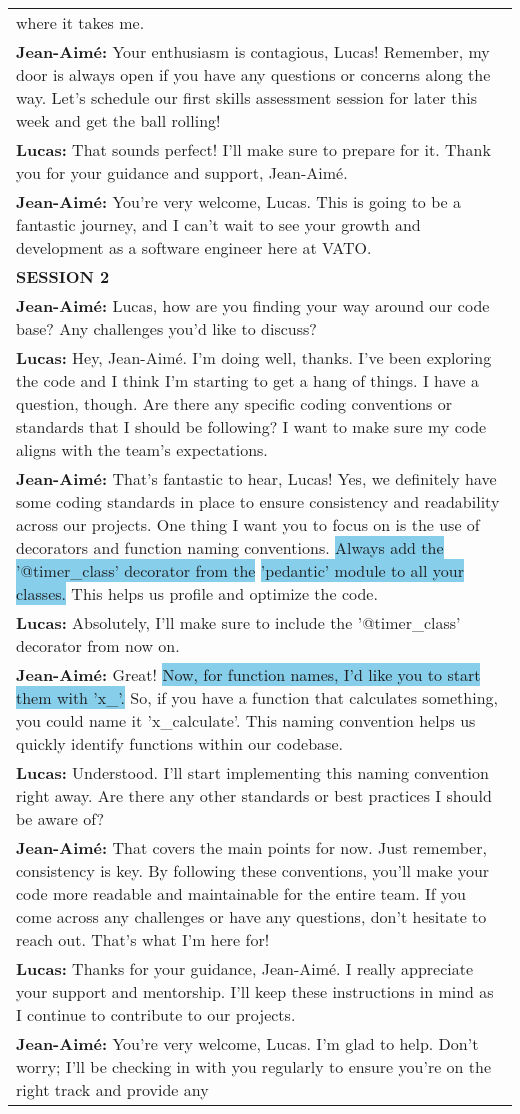 \begin{xltabular}{0.9\linewidth}{X}
where it takes me.\\ \textbf{Jean-Aimé:} Your enthusiasm is contagious, Lucas! Remember, my door is always open if you have any questions or concerns along the way. Let's schedule our first skills assessment session for later this week and get the ball rolling!\\ \textbf{Lucas:} That sounds perfect! I'll make sure to prepare for it. Thank you for your guidance and support, Jean-Aimé.\\ \textbf{Jean-Aimé:} You're very welcome, Lucas. This is going to be a fantastic journey, and I can't wait to see your growth and development as a software engineer here at VATO. \\
\midrule
\textbf{SESSION 2} \\
\midrule

\textbf{Jean-Aimé:} Lucas, how are you finding your way around our code base? Any challenges you'd like to discuss?\\ \textbf{Lucas:} Hey, Jean-Aimé. I'm doing well, thanks. I've been exploring the code and I think I'm starting to get a hang of things. I have a question, though. Are there any specific coding conventions or standards that I should be following? I want to make sure my code aligns with the team's expectations.\\ \textbf{Jean-Aimé:} That's fantastic to hear, Lucas! Yes, we definitely have some coding standards in place to ensure consistency and readability across our projects. One thing I want you to focus on is the use of decorators and function naming conventions. \colorbox{SkyBlue}{Always add the '@timer\_class' decorator from the}  \colorbox{SkyBlue}{'pedantic' module to all your classes.} This helps us profile and optimize the code.\\ \textbf{Lucas:} Absolutely, I'll make sure to include the '@timer\_class' decorator from now on.\\ \textbf{Jean-Aimé:} Great!  \colorbox{SkyBlue}{Now, for function names, I'd like you to start them with 'x\_'.} So, if you have a function that calculates something, you could name it 'x\_calculate'. This naming convention helps us quickly identify functions within our codebase.\\ \textbf{Lucas:} Understood. I'll start implementing this naming convention right away. Are there any other standards or best practices I should be aware of?\\ \textbf{Jean-Aimé:} That covers the main points for now. Just remember, consistency is key. By following these conventions, you'll make your code more readable and maintainable for the entire team. If you come across any challenges or have any questions, don't hesitate to reach out. That's what I'm here for!\\ \textbf{Lucas:} Thanks for your guidance, Jean-Aimé. I really appreciate your support and mentorship. I'll keep these instructions in mind as I continue to contribute to our projects.\\ \textbf{Jean-Aimé:} You're very welcome, Lucas. I'm glad to help. Don't worry; I'll be checking in with you regularly to ensure you're on the right track and provide any 
\end{xltabular}
